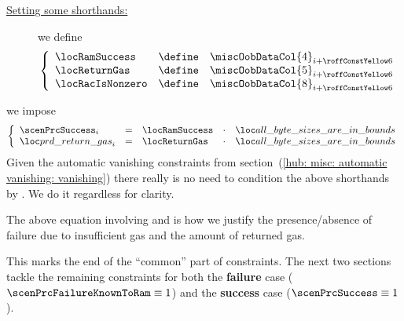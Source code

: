 \begin{description}
\begin{description}
						\item[\underline{Setting some shorthands:}]
							we define
							\[
								\left\{ \begin{array}{lcl}
									\locRamSuccess   & \define & \miscOobDataCol{4} _{i + \prcModexpPricingRowOffset} \\
									\locReturnGas    & \define & \miscOobDataCol{5} _{i + \prcModexpPricingRowOffset} \\
									\locRacIsNonzero & \define & \miscOobDataCol{8} _{i + \prcModexpPricingRowOffset} \\
								\end{array} \right.
							\]
					\end{description}
				\item[\underline{\underline{Justifying precompile success / failure scenarios:}}]
					we impose
					\[
						\left\{ \begin{array}{lclcl}
							\scenPrcSuccess  _{i} & = & \locRamSuccess & \cdot & \locAllByteSizesAreInBounds \\
							\locPrcReturnGas _{i} & = & \locReturnGas  & \cdot & \locAllByteSizesAreInBounds \\
						\end{array} \right.
					\]
					\saNote{}
					Given the automatic vanishing constraints from
					section~(\ref{hub: misc: automatic vanishing: vanishing})
					there really is no need to condition the above shorthands
					by \locAllByteSizesAreInBounds{}.
					We do it regardless for clarity.
			\end{description}
			\saNote{} The above equation involving \scenPrcFailure{} and \locPrcReturnGas{} is how we justify the presence/absence of failure due to insufficient gas and the amount of returned gas.

			This marks the end of the ``common'' part of constraints.
			The next two sections tackle the remaining constraints for both the
			\textbf{failure} case ($\scenPrcFailureKnownToRam \equiv 1$) and the
			\textbf{success} case ($\scenPrcSuccess \equiv 1$).
